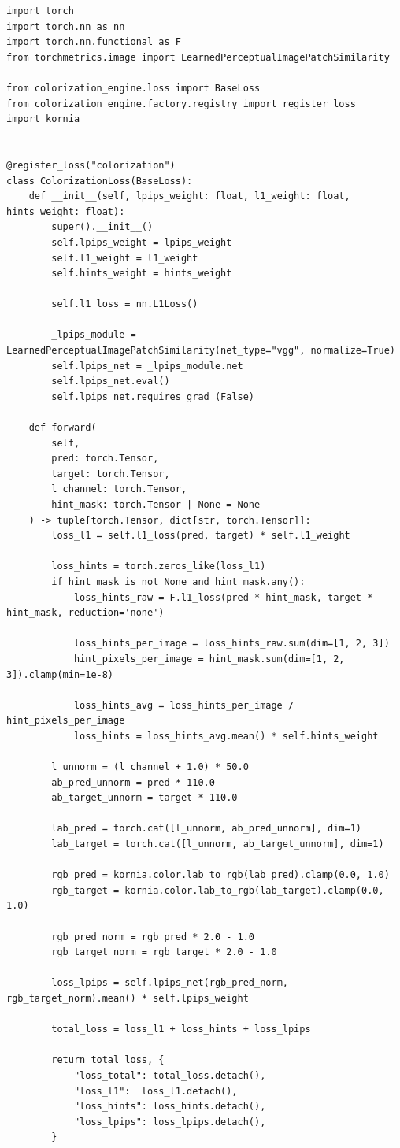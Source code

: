 \begin{lstlisting}[caption={Реалізація гібридної функції втрат (PyTorch)}]
import torch
import torch.nn as nn
import torch.nn.functional as F
from torchmetrics.image import LearnedPerceptualImagePatchSimilarity

from colorization_engine.loss import BaseLoss
from colorization_engine.factory.registry import register_loss
import kornia


@register_loss("colorization")
class ColorizationLoss(BaseLoss):
    def __init__(self, lpips_weight: float, l1_weight: float, hints_weight: float):
        super().__init__()
        self.lpips_weight = lpips_weight
        self.l1_weight = l1_weight
        self.hints_weight = hints_weight

        self.l1_loss = nn.L1Loss()

        _lpips_module = LearnedPerceptualImagePatchSimilarity(net_type="vgg", normalize=True)
        self.lpips_net = _lpips_module.net
        self.lpips_net.eval()
        self.lpips_net.requires_grad_(False)

    def forward(
        self,
        pred: torch.Tensor,
        target: torch.Tensor,
        l_channel: torch.Tensor,
        hint_mask: torch.Tensor | None = None
    ) -> tuple[torch.Tensor, dict[str, torch.Tensor]]:
        loss_l1 = self.l1_loss(pred, target) * self.l1_weight

        loss_hints = torch.zeros_like(loss_l1)
        if hint_mask is not None and hint_mask.any():
            loss_hints_raw = F.l1_loss(pred * hint_mask, target * hint_mask, reduction='none')

            loss_hints_per_image = loss_hints_raw.sum(dim=[1, 2, 3])
            hint_pixels_per_image = hint_mask.sum(dim=[1, 2, 3]).clamp(min=1e-8)

            loss_hints_avg = loss_hints_per_image / hint_pixels_per_image
            loss_hints = loss_hints_avg.mean() * self.hints_weight

        l_unnorm = (l_channel + 1.0) * 50.0
        ab_pred_unnorm = pred * 110.0
        ab_target_unnorm = target * 110.0

        lab_pred = torch.cat([l_unnorm, ab_pred_unnorm], dim=1)
        lab_target = torch.cat([l_unnorm, ab_target_unnorm], dim=1)

        rgb_pred = kornia.color.lab_to_rgb(lab_pred).clamp(0.0, 1.0)
        rgb_target = kornia.color.lab_to_rgb(lab_target).clamp(0.0, 1.0)

        rgb_pred_norm = rgb_pred * 2.0 - 1.0
        rgb_target_norm = rgb_target * 2.0 - 1.0

        loss_lpips = self.lpips_net(rgb_pred_norm, rgb_target_norm).mean() * self.lpips_weight

        total_loss = loss_l1 + loss_hints + loss_lpips

        return total_loss, {
            "loss_total": total_loss.detach(),
            "loss_l1":  loss_l1.detach(),
            "loss_hints": loss_hints.detach(),
            "loss_lpips": loss_lpips.detach(),
        }
\end{lstlisting}